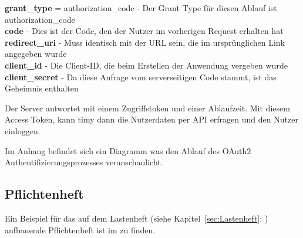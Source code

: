\textbf{grant\_type} = authorization\_code - Der Grant Type für diesen Ablauf ist authorization\_code \\
\textbf{code} - Dies ist der Code, den der Nutzer im vorherigen Request erhalten hat \\
\textbf{redirect\_uri} - Muss identisch mit der URL sein, die im ursprünglichen Link angegeben wurde \\
\textbf{client\_id} - Die Client-ID, die beim Erstellen der Anwendung vergeben wurde \\
\textbf{client\_secret} - Da diese Anfrage vom serverseitigen Code stammt, ist das Geheimnis enthalten

Der Server antwortet mit einem Zugriffstoken und einer Ablaufzeit. Mit diesem Access Token, kann timy dann die Nutzerdaten per API erfragen und den Nutzer einloggen.

Im Anhang  befindet sich ein Diagramm was den Ablauf des OAuth2 Authentifizierungsprozesses veranschaulicht. 

\subsection{Pflichtenheft}
\label{sec:Pflichtenheft}

Ein Beispiel für das auf dem Lastenheft (siehe Kapitel~\ref{sec:Lastenheft}: ) aufbauende Pflichtenheft ist im  zu finden.


